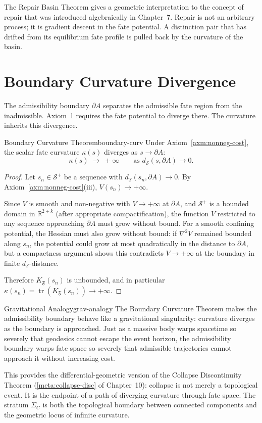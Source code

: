 \documentclass[12pt,twoside,openright]{book}
\newcommand{\fateMap}{\mathfrak{F}}
\newcommand{\fateSpace}{\mathcal{S}}
\newcommand{\strataC}{\Sigma_{C}}   %
\newcommand{\admRegion}{A}
\providecommand{\strataC}{\Sigma_{C}}
\providecommand{\fatePos}{\fateSpace^{+}}
\providecommand{\admRegion}{A}
\providecommand{\fatePot}{V}
\providecommand{\fateKurv}{K_{\fateMap}}
\begin{document}
The Repair Basin Theorem gives a geometric interpretation to
the concept of repair that was introduced algebraically in
Chapter~7. Repair is not an arbitrary process; it is
gradient descent in the fate potential. A distinction pair that
has drifted from its equilibrium fate profile is pulled back by
the curvature of the basin.

\section{Boundary Curvature Divergence}

The admissibility boundary $\partial\admRegion$ separates the
admissible fate region from the inadmissible. Axiom~1 requires
the fate potential to diverge there. The curvature inherits
this divergence.

\begin{theorem}{Boundary Curvature Theorem}{boundary-curv}
Under Axiom~\ref{axm:nonneg-cost}, the scalar fate curvature
$\kappa(s)$ diverges as $s\to\partial\admRegion$:
\[
  \kappa(s)\;\longrightarrow\;+\infty
  \qquad
  \text{as }
  d_{\fateSpace}(s,\partial\admRegion)\to 0.
\]
\begin{proof}
Let $s_n\in\fatePos$ be a sequence with
$d_{\fateSpace}(s_n,\partial\admRegion)\to 0$.
By Axiom~\ref{axm:nonneg-cost}(iii), $\fatePot(s_n)\to+\infty$.

Since $\fatePot$ is smooth and non-negative with $\fatePot\to
+\infty$ at $\partial\admRegion$, and $\fatePos$ is a bounded
domain in $\mathbb{R}^{2+k}$ (after appropriate compactification),
the function $\fatePot$ restricted to any sequence approaching
$\partial\admRegion$ must grow without bound. For a smooth
confining potential, the Hessian must also grow without bound:
if $\nabla^2\fatePot$ remained bounded along $s_n$, the
potential could grow at most quadratically in the distance to
$\partial\admRegion$, but a compactness argument shows this
contradicts $\fatePot\to+\infty$ at the boundary in finite
$d_{\fateSpace}$-distance.

Therefore $\fateKurv(s_n)$ is unbounded, and in particular
$\kappa(s_n)=\operatorname{tr}(\fateKurv(s_n))\to+\infty$.
\end{proof}
\end{theorem}

\begin{remark}{Gravitational Analogy}{grav-analogy}
The Boundary Curvature Theorem makes the admissibility boundary
behave like a gravitational singularity: curvature diverges as
the boundary is approached. Just as a massive body warps
spacetime so severely that geodesics cannot escape the event
horizon, the admissibility boundary warps fate space so severely
that admissible trajectories cannot approach it without
increasing cost.

This provides the differential-geometric version of the
Collapse Discontinuity Theorem (\cref{meta:collapse-disc} of
Chapter~10): collapse is not merely a topological event. It is
the endpoint of a path of diverging curvature through fate space.
The stratum $\strataC$ is both the topological boundary between
connected components and the geometric locus of infinite
curvature.
\end{remark}
\end{document}
